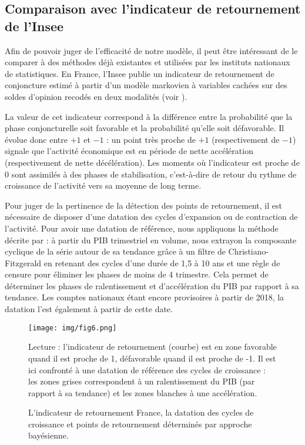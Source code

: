 \documentclass[10pt,french,french]{article}
\begin{document}
\hypertarget{sec:indretFr}{%
\subsection{Comparaison avec l'indicateur de retournement de l'Insee}\label{sec:indretFr}}

Afin de pouvoir juger de l'efficacité de notre modèle, il peut être intéressant de le comparer à des méthodes déjà existantes et utilisées par les instituts nationaux de statistiques.
En France, l'Insee publie un indicateur de retournement de conjoncture estimé à partir d'un modèle markovien à variables cachées sur des soldes d'opinion recodés en deux modalités (voir \cite{indretFR}).

La valeur de cet indicateur correspond à la différence entre la probabilité que la phase conjoncturelle soit favorable et la probabilité qu'elle soit défavorable.
Il évolue donc entre \(+1\) et \(-1\) : un point très proche de \(+1\) (respectivement de \(-1\)) signale que l'activité économique est en période de nette accélération (respectivement de nette décélération).
Les moments où l'indicateur est proche de 0 sont assimilés à des phases de stabilisation, c'est-à-dire de retour du rythme de croissance de l'activité vers sa moyenne de long terme.

Pour juger de la pertinence de la détection des points de retournement, il est nécessaire de disposer d'une datation des cycles d'expansion ou de contraction de l'activité.
Pour avoir une datation de référence, nous appliquons la méthode décrite par \cite{bardaji} : à partir du PIB trimestriel en volume, nous extrayon la composante cyclique de la série autour de sa tendance grâce à un filtre de Christiano-Fitzgerald en retenant des cycles d'une durée de 1,5 à 10 ans et une règle de censure pour éliminer les phases de moins de 4 trimestre.
Cela permet de déterminer les phases de ralentissement et d'accélération du PIB par rapport à sa tendance.
Les comptes nationaux étant encore provisoires à partir de 2018, la datation l'est également à partir de cette date.

\begin{figure}[h]
{\centering
\texttt{[image: img/fig6.png]}
\caption{L’indicateur de retournement France, la datation des cycles de croissance et points de retournement déterminés par approche bayésienne.}\label{fig:indret}}
\footnotesize
Lecture : l’indicateur de retournement (courbe) est en zone favorable quand il est proche de 1, défavorable quand il est proche de -1. Il est ici confronté à une datation de référence des cycles de croissance : les zones grises correspondent à un ralentissement du PIB (par rapport à sa tendance) et les zones blanches à une accélération.
\end{figure}
\end{document}
